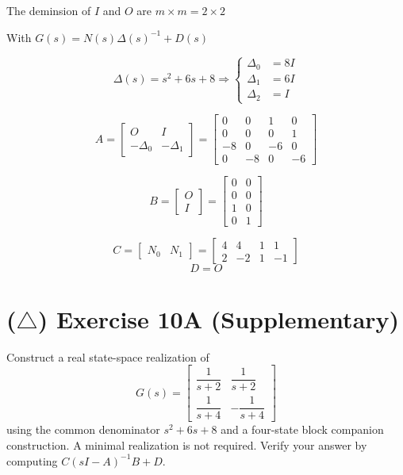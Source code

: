 \documentclass[12pt,a4paper]{article}
\begin{document}
The deminsion of $I$ and $O$ are $m \times m = 2 \times 2$

With $G(s) = N(s)\Delta(s)^{-1} + D(s)$

\[
\Delta(s) = s^2 + 6s + 8 \Rightarrow \begin{cases}
	\Delta_0 &= 8I \\
	\Delta_1 &= 6I \\
	\Delta_2 &= I
\end{cases}
\]

\[
A = \begin{bmatrix}
	O & I \\
	-\Delta_0 & -\Delta_1
\end{bmatrix} = \begin{bmatrix}
0 & 0 & 1& 0 \\
0 & 0 & 0 & 1 \\
-8 & 0 & -6 & 0 \\
0 & -8 & 0 & -6
\end{bmatrix}
\]

\[
B = \begin{bmatrix}
	O \\ I 
\end{bmatrix} = \begin{bmatrix}
 0 & 0 \\
0 & 0 \\ 
1 & 0 \\
0 & 1
\end{bmatrix}
\]

\[
C = \begin{bmatrix}
	N_0 & N_1
\end{bmatrix} = \begin{bmatrix}
4 & 4 & 1 & 1\\
2 & -2 & 1 & -1
\end{bmatrix}
\]
\[
D = O
\]
\vspace{3cm}
\clearpage
\section*{($\triangle$) Exercise 10A \hfill {\normalsize (Supplementary)}}
Construct a real state-space realization of
\[
G(s)=\begin{bmatrix}
\dfrac1{s+2}&\dfrac1{s+2}\\[4pt]
\dfrac1{s+4}&-\dfrac1{s+4}
\end{bmatrix}
\]
using the common denominator $s^2+6s+8$ and a four-state block companion
construction. A minimal realization is not required.
Verify your answer by computing $C(sI-A)^{-1}B+D$.
\end{document}
